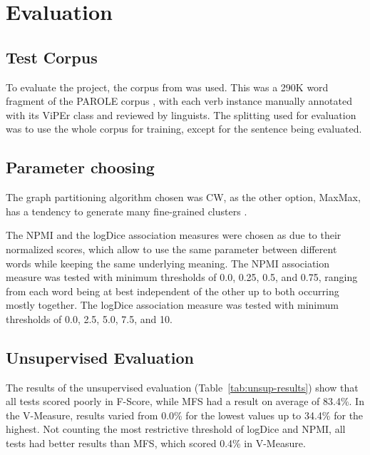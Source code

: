 \chapter{Evaluation}
\label{ch:eval}



\section{Test Corpus}

To evaluate the project, the corpus from \citep{baptista2013viper} was used. 
This was a 290K word fragment of the PAROLE corpus \citep{nascimento1998parole}, with each verb instance manually annotated with its ViPEr class and reviewed by linguists. The splitting used for evaluation was to use the whole corpus for training, except for the sentence being evaluated.

\section{Parameter choosing}

The graph partitioning algorithm chosen was \ac{CW}, as the other option,
MaxMax, has a tendency to generate many fine-grained clusters
\citep{hope2013uos}.

The \ac{NPMI} and the logDice association measures were chosen as due to their
normalized scores, which allow to use the same parameter between different words
while keeping the same underlying meaning. The \ac{NPMI} association measure 
was tested with minimum thresholds of 0.0, 0.25, 0.5, and 0.75, ranging from 
each word being at best independent of the other up to both occurring mostly 
together. The logDice association measure was tested with minimum thresholds of 
0.0, 2.5, 5.0, 7.5, and 10.

\section{Unsupervised Evaluation}

The results of the unsupervised evaluation (Table~\ref{tab:unsup-results}) show 
that all tests scored poorly in F-Score, while \ac{MFS} had a result on average 
of 83.4\%. In the V-Measure, results varied from 0.0\% for the lowest values up 
to 34.4\% for the highest. Not counting the most restrictive threshold of 
logDice and NPMI, all tests had better results than \ac{MFS}, which scored 
0.4\% in V-Measure.

